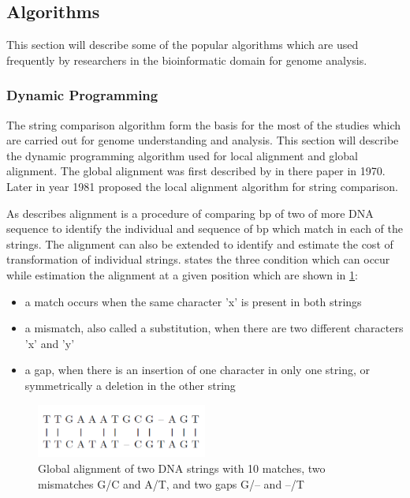 \documentclass[12pt,twoside]{article}
\begin{document}
\subsection{Algorithms}

This section will describe some of the popular algorithms which are used frequently by researchers in the bioinformatic
domain for genome analysis.

\subsubsection{Dynamic Programming}
\label{dp}

The string comparison algorithm form the basis for the most of the studies which are carried out for
genome understanding and analysis. This section will describe the dynamic programming algorithm
used for local alignment and global alignment. The global alignment was first described by \textcite{needleman_general_1970}
in there paper in 1970. Later in year 1981 \textcite{smith_identification_1981} proposed the local alignment algorithm
for string comparison.

As \textcite[Chapter 3]{mount_bioinformatics:_2004} describes alignment is a procedure of comparing bp of two of more DNA sequence
to identify the individual and sequence of bp which match in each of the strings. The alignment can also be extended to
identify and estimate the cost of transformation of individual strings. \cite{gokhale_reconfigurable_2010} states the three
condition which can occur while estimation the alignment at a given position which are shown in \cref{fig:alignment}:

\begin{itemize}
	\item a match occurs when the same character 'x' is present in both strings
	\item a mismatch, also called a substitution, when there are two different characters 'x' and 'y'
	\item a gap, when there is an insertion of one character in only one string, or symmetrically a deletion in the other string
\end{itemize}

\begin{figure}%
    \centering
    \includegraphics[width=0.5\textwidth]{fig/alignment}
    \caption{Global alignment of two DNA strings with 10 matches, two mismatches
	G/C and A/T, and two gaps G/– and –/T \cite[Figure 8.2]{gokhale_reconfigurable_2010}}
    \label{fig:alignment}
\end{figure}
\end{document}
